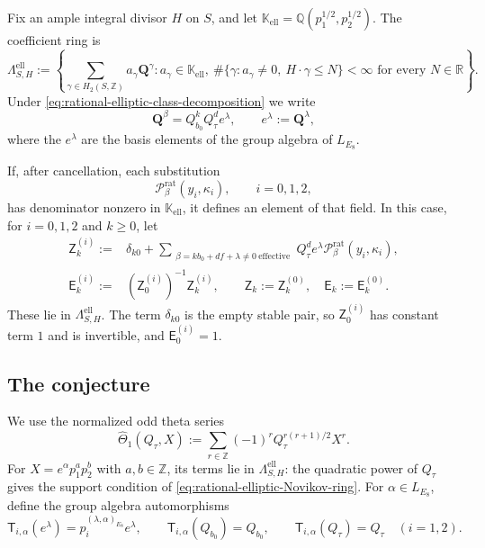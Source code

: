 \documentclass{amsart}
\theoremstyle{definition}
\numberwithin{equation}{section}
\newcommand{\Q}{\mathbb Q}
\newcommand{\Z}{\mathbb Z}
\newcommand{\K}{\mathbb K}
\begin{document}
Fix an ample integral divisor \(H\) on \(S\), and let \(\K_{\mathrm{ell}} =\Q(p_1^{1/2},p_2^{1/2})\).  The coefficient ring is
\begin{equation}
 \Lambda_{S,H}^{\mathrm{ell}}
 :=\left\{\sum_{\gamma\in H_2(S,\Z)}a_\gamma \mathbf Q^\gamma:
 a_\gamma\in\K_{\mathrm{ell}},\
 \#\{\gamma:a_\gamma\ne0,\ H\cdot\gamma\leq N\}<\infty
 \text{ for every }N\in\mathbb R\right\}.
\label{eq:rational-elliptic-Novikov-ring}
\end{equation}
Under \eqref{eq:rational-elliptic-class-decomposition} we write
\[
 \mathbf Q^\beta=Q_{b_0}^kQ_\tau^d e^\lambda,
 \qquad e^\lambda:=\mathbf Q^\lambda,
\]
where the \(e^\lambda\) are the basis elements of the group algebra of \(L_{E_8}\).

If, after cancellation, each substitution
\begin{equation}
 \mathcal P_\beta^{\mathrm{rat}}(y_i,\kappa_i),
 \qquad i=0,1,2,
\label{eq:rational-elliptic-specialization-regularity}
\end{equation}
has denominator nonzero in \(\K_{\mathrm{ell}}\), it defines an element of that field.  In this case, for \(i=0,1,2\) and \(k\geq0\), let
\begin{equation}
\begin{aligned}
 \mathsf Z_k^{(i)}
 :={}&\delta_{k0}
 +\sum_{\substack{\beta=kb_0+df+\lambda\ne0\ \mathrm{effective}}}
 Q_\tau^d e^\lambda
 \mathcal P_\beta^{\mathrm{rat}}(y_i,\kappa_i),\\
 \mathsf E_k^{(i)}
 :={}&(\mathsf Z_0^{(i)})^{-1}\mathsf Z_k^{(i)},
 \qquad \mathsf Z_k:=\mathsf Z_k^{(0)},\quad
 \mathsf E_k:=\mathsf E_k^{(0)}.
\end{aligned}
\label{eq:rational-elliptic-Ek-definition}
\end{equation}
These lie in \(\Lambda_{S,H}^{\mathrm{ell}}\).  The term \(\delta_{k0}\) is the empty stable pair, so \(\mathsf Z_0^{(i)}\) has constant term \(1\) and is invertible, and \(\mathsf E_0^{(i)}=1\).

\subsection{The conjecture}
We use the normalized odd theta series
\begin{equation}
 \widehat\Theta_1(Q_\tau,X)
 :=\sum_{r\in\Z}(-1)^r
 Q_\tau^{r(r+1)/2}X^r.
\label{eq:logarithmic-odd-theta}
\end{equation}
For \(X=e^\alpha p_1^a p_2^b\) with \(a,b\in\Z\), its terms lie in \(\Lambda_{S,H}^{\mathrm{ell}}\): the quadratic power of \(Q_\tau\) gives the support condition of \eqref{eq:rational-elliptic-Novikov-ring}.  For \(\alpha\in L_{E_8}\), define the group algebra automorphisms
\begin{equation}
 \mathsf T_{i,\alpha}(e^\lambda)
 =p_i^{(\lambda,\alpha)_{E_8}}e^\lambda,
 \qquad
 \mathsf T_{i,\alpha}(Q_{b_0})=Q_{b_0},\qquad
 \mathsf T_{i,\alpha}(Q_\tau)=Q_\tau
 \quad(i=1,2).
\label{eq:rational-elliptic-character-translation}
\end{equation}
\end{document}
